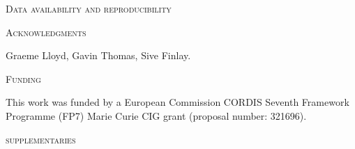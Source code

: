 \documentclass[12pt,letterpaper]{article}
\renewcommand{\section}[1]{%
\bigskip
\begin{center}
\begin{Large}
\normalfont\scshape #1
\medskip
\end{Large}
\end{center}}
\begin{document}

\section{Data availability and reproducibility}

\section{Acknowledgments}
Graeme Lloyd, Gavin Thomas, Sive Finlay.

\section{Funding} %
This work was funded by a European Commission CORDIS Seventh Framework Programme (FP7) Marie Curie CIG grant (proposal number: 321696).





\section{supplementaries}
\end{document}
